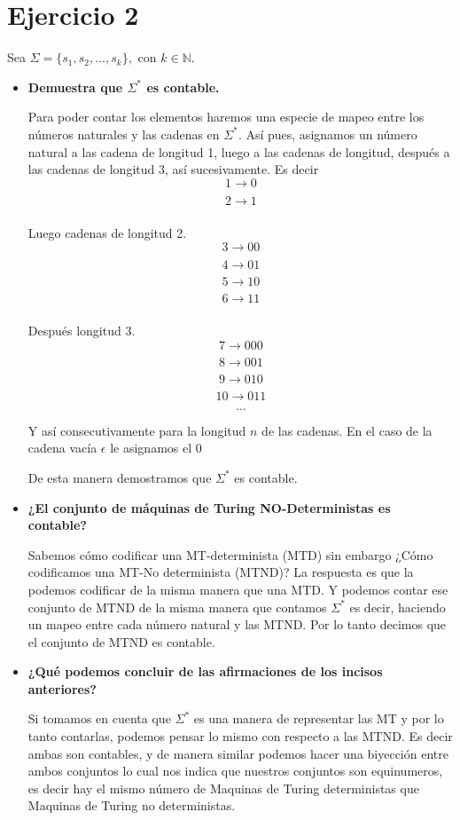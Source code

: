\documentclass[12pt,letterpaper]{article}
\begin{document}
\section*{Ejercicio 2}
Sea $\Sigma = \{s_1, s_2, ..., s_k\},$ con $k \in \mathbb N$.
\begin{itemize}
    \item \textbf{Demuestra que $\Sigma ^*$ es contable.} 
    
    Para poder contar los elementos haremos una especie de mapeo entre los números naturales y las cadenas en $\Sigma^*$. Así pues, asignamos un número natural a las cadena de longitud 1, luego a las cadenas de longitud, después a las cadenas de longitud 3, así sucesivamente. Es decir $$1 \xrightarrow[]{} 0$$$$2 \xrightarrow[]{} 1$$
    
    Luego cadenas de longitud 2. $$3 \xrightarrow[]{} 00$$$$4 \xrightarrow[]{} 01$$$$5 \xrightarrow[]{} 10$$$$6 \xrightarrow[]{} 11$$
    
    Después longitud 3. $$7 \xrightarrow[]{} 000$$$$8 \xrightarrow[]{} 001$$$$9 \xrightarrow[]{} 010$$$$10 \xrightarrow[]{} 011$$$$\dots$$
    
    Y así consecutivamente para la longitud $n$ de las cadenas. En el caso de la cadena vacía $\epsilon$ le asignamos el 0
    
    De esta manera demostramos que $\Sigma^*$ es contable.
    
    \item \textbf{¿El conjunto de máquinas de Turing NO-Deterministas es contable?}
    
    Sabemos cómo codificar una MT-determinista (MTD) sin embargo ¿Cómo codificamos una MT-No determinista (MTND)? La respuesta es que la podemos codificar de la misma manera que una MTD. Y podemos contar ese conjunto de MTND de la misma manera que contamos $\Sigma^*$ es decir, haciendo un mapeo entre cada número natural y las MTND. Por lo tanto decimos que el conjunto de MTND es contable.
    
    
    \item \textbf{¿Qué podemos concluir de las afirmaciones de los incisos anteriores?}
    
    Si tomamos en cuenta que $\Sigma^*$ es una manera de representar las MT y por lo tanto contarlas, podemos pensar lo mismo con respecto a las MTND. Es decir ambas son contables, y de manera similar podemos hacer una biyección entre ambos conjuntos lo cual nos indica que nuestros conjuntos son equinumeros, es decir hay el mismo número de Maquinas de Turing deterministas que Maquinas de Turing no deterministas.
\end{itemize}
\end{document}
